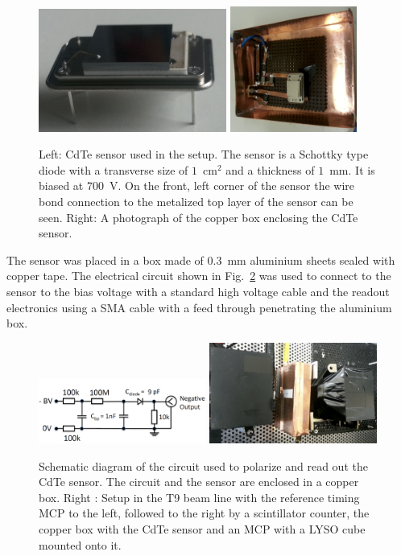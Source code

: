 \begin{figure}[htbp] 
\centering
\includegraphics[width=0.55\textwidth]{figures/CdTeSensor.png} 
\includegraphics[width=0.37\textwidth]{figures/CdTeSensorBox.png} 
\caption{Left: CdTe sensor used in the setup. The sensor is a Schottky type diode with a transverse size 
of $1$~$\mathrm{cm}^{2}$ and a thickness of $1$~mm. It is biased at $700$~V. 
On the front, left corner of the sensor the wire bond connection 
to the metalized top layer of the sensor can be seen. Right: A photograph of the copper box
enclosing the CdTe sensor. } 
\label{fig:CdTeSensor} 
\end{figure} 
%
The sensor was placed in a box made of $0.3$~mm aluminium sheets sealed with copper tape. 
The electrical circuit shown in Fig.~\ref{fig:cdtecircuit} was used to connect to the sensor to the bias 
voltage with a standard high voltage cable and the readout electronics using a SMA cable with a feed 
through penetrating the aluminium box.

%
\begin{figure}[htbp] 
\centering
\includegraphics[width=0.49\textwidth]{figures/circuit_CdTe.png} 
\includegraphics[width=0.49\textwidth]{figures/CdTeT9Setup.png} 
\caption{Schematic diagram of the circuit used to polarize and read out the 
CdTe sensor. The circuit and the sensor are enclosed in a copper box. Right : Setup in the T9 beam line with the reference timing MCP to the left, followed to the right by a scintillator counter, the copper box with the CdTe sensor and an MCP with a LYSO cube mounted onto it.} 
\label{fig:cdtecircuit} 
\end{figure} 
%
